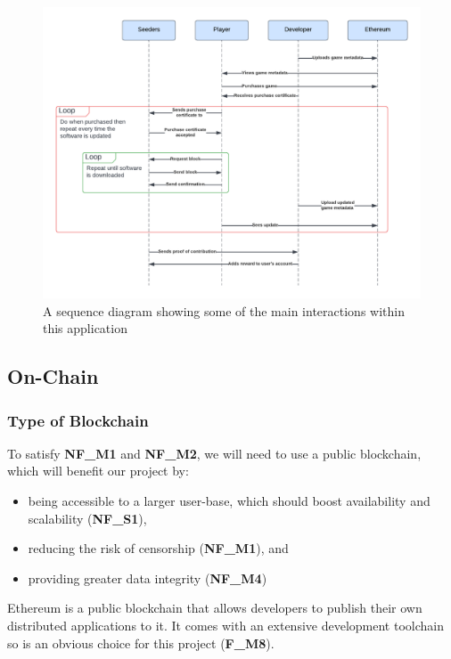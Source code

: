 \begin{figure}[ht]
  \centering
  \includegraphics[width=.95\textwidth]{assets/images/diagrams/seqeunce-diagram.png}
  \caption{A sequence diagram showing some of the main interactions within this application}
  \label{fig:sequence-diagram}
\end{figure}


\subsection{On-Chain}

\subsubsection*{Type of Blockchain}

To satisfy \textbf{NF\_M1} and \textbf{NF\_M2}, we will need to use a public blockchain, which will benefit our project by:
\vspace{2mm}
\begin{itemize}
  \item being accessible to a larger user-base, which should boost availability and scalability (\textbf{NF\_S1}),
  \item reducing the risk of censorship (\textbf{NF\_M1}), and
  \item providing greater data integrity (\textbf{NF\_M4})
\end{itemize}

\vspace{2mm}\noindent Ethereum is a public blockchain that allows developers to publish their own distributed applications to it. It comes with an extensive development toolchain so is an obvious choice for this project (\textbf{F\_M8}).

